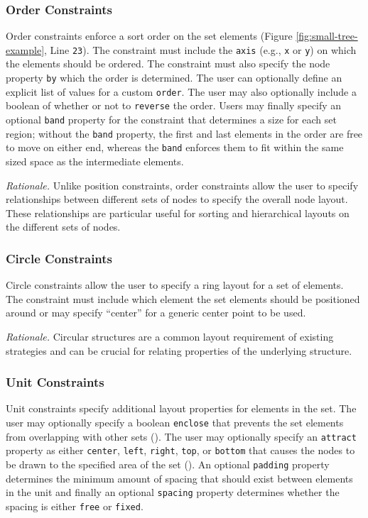 \subsubsection{Order Constraints}
 Order constraints enforce a sort order on the set
elements (Figure \ref{fig:small-tree-example}, Line \texttt{23}). The
constraint must include the \texttt{axis} (e.g., \texttt{x} or \texttt{y})
on which the elements should be ordered. The constraint must also specify
the node property \texttt{by} which the order is determined. The user can
optionally define an explicit list of values for a custom
\texttt{order}. The user may also optionally include a boolean of whether
or not to \texttt{reverse} the order. Users may finally specify an optional
\texttt{band} property for the constraint that determines a size for each
set region; without the \texttt{band} property, the first and last elements
in the order are free to move on either end, whereas the \texttt{band}
enforces them to fit within the same sized space as the intermediate
elements.

\emph{Rationale.} Unlike position constraints, order constraints allow the
user to specify relationships between different sets of nodes to specify
the overall node layout. These relationships are particular useful for
sorting and hierarchical layouts on the different sets of nodes.

\subsubsection{Circle Constraints}
 Circle
constraints allow the user to specify a ring layout for a set of
elements. The constraint must include which element the set elements should
be positioned around or may specify ``center'' for a generic center point
to be used.

\emph{Rationale.} Circular structures are a common layout requirement of
existing strategies  and can be crucial for relating
properties of the underlying structure.

\subsubsection{Unit Constraints}
 Unit constraints specify additional layout
properties for elements in the set. The user may optionally specify a
boolean \texttt{enclose} that prevents the set elements from overlapping
with other sets (). The user may optionally specify an
\texttt{attract} property as either \texttt{center}, \texttt{left},
\texttt{right}, \texttt{top}, or \texttt{bottom} that causes the nodes to
be drawn to the specified area of the set (). An optional
\texttt{padding} property determines the minimum amount of spacing that
should exist between elements in the unit and finally an optional
\texttt{spacing} property determines whether the spacing is either
\texttt{free} or \texttt{fixed}.

